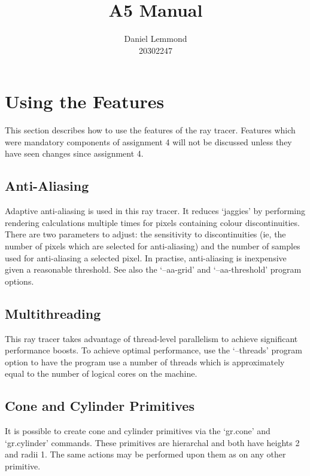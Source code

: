 \documentclass{article}
\begin{document}
\title{A5 Manual}
\author{Daniel Lemmond\\
20302247}

\maketitle

\section{Using the Features}

This section describes how to use the features of the ray tracer. Features which
were mandatory components of assignment 4 will not be discussed unless they have
seen changes since assignment 4.

\subsection{Anti-Aliasing}

Adaptive anti-aliasing is used in this ray tracer. It reduces `jaggies' by
performing rendering calculations multiple times for pixels containing colour
discontinuities. There are two parameters to adjust: the sensitivity to
discontinuities (ie, the number of pixels which are selected for anti-aliasing)
and the number of samples used for anti-aliasing a selected pixel. In practise,
anti-aliasing is inexpensive given a reasonable threshold. See also the
`--aa-grid' and `--aa-threshold' program options.

\subsection{Multithreading}

This ray tracer takes advantage of thread-level parallelism to achieve
significant performance boosts. To achieve optimal performance, use the
`--threads' program option to have the program use a number of threads which is
approximately equal to the number of logical cores on the machine.

\subsection{Cone and Cylinder Primitives}

It is possible to create cone and cylinder primitives via the `gr.cone' and
`gr.cylinder' commands. These primitives are hierarchal and both have heights
2 and radii 1. The same actions may be performed
upon them as on any other primitive.
\end{document}
